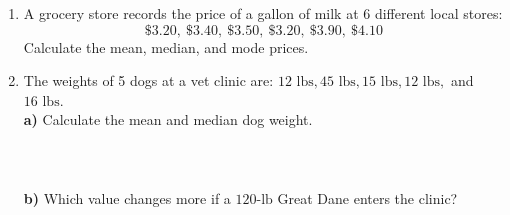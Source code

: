 \documentclass[12pt, letterpaper, fleqn]{article}
\newcommand{\blanklong}{\underline{\hspace{6.5cm}}}
\begin{document}
\begin{enumerate}[itemsep=2.5cm, leftmargin=0.6cm]
\item A grocery store records the price of a gallon of milk at 6 different local stores: \\
$$\$3.20, \ \$3.40, \ \$3.50, \ \$3.20, \ \$3.90, \ \$4.10$$
Calculate the mean, median, and mode prices.
\vspace{1.5cm}

\item The weights of 5 dogs at a vet clinic are: $12\text{ lbs}, 45\text{ lbs}, 15\text{ lbs}, 12\text{ lbs},$ and $16\text{ lbs}$. \\
\textbf{a)} Calculate the mean and median dog weight. \\ \\
\blanklong \\ \\ 
\textbf{b)} Which value changes more if a $120\text{-lb}$ Great Dane enters the clinic? \\ \\
\blanklong \\
\end{enumerate}
\end{document}

